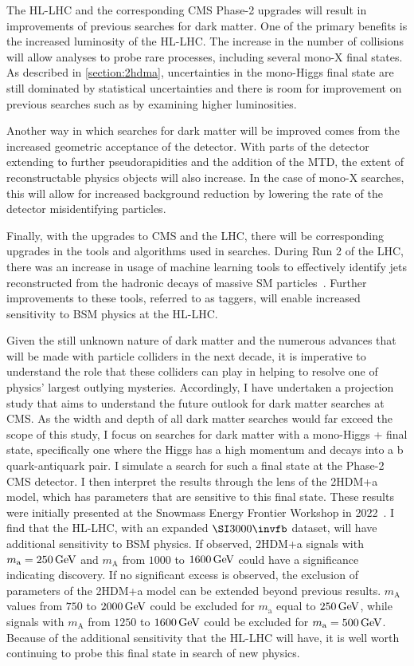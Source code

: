 The HL-LHC and the corresponding CMS Phase-2 upgrades will result in improvements of previous searches for dark matter. One of the primary benefits is the increased luminosity of the HL-LHC. The increase in the number of collisions will allow analyses to probe rare processes, including several mono-X final states. As described in \cref{section:2hdma}, uncertainties in the mono-Higgs final state are still dominated by statistical uncertainties and there is room for improvement on previous searches such as \cite{cms:hbb2019,atlas:hbb2017,atlas:hbb2021} by examining higher luminosities.

Another way in which searches for dark matter will be improved comes from the increased geometric acceptance of the detector. With parts of the detector extending to further pseudorapidities and the addition of the MTD, the extent of reconstructable physics objects will also increase. In the case of mono-X searches, this will allow for increased background reduction by lowering the rate of the detector misidentifying particles.

Finally, with the upgrades to CMS and the LHC, there will be corresponding upgrades in the tools and algorithms used in searches. During Run 2 of the LHC, there was an increase in usage of machine learning tools to effectively identify jets reconstructed from the hadronic decays of massive SM particles~\cite{CMS:2020mlt}. Further improvements to these tools, referred to as taggers, will enable increased sensitivity to BSM physics at the HL-LHC.

Given the still unknown nature of dark matter and the numerous advances that will be made with particle colliders in the next decade, it is imperative to understand the role that these colliders can play in helping to resolve one of physics' largest outlying mysteries. Accordingly, I have undertaken a projection study that aims to understand the future outlook for dark matter searches at CMS. As the width and depth of all dark matter searches would far exceed the scope of this study, I focus on searches for dark matter with a mono-Higgs + \ptmiss final state, specifically one where the Higgs has a high momentum and decays into a b quark-antiquark pair. I simulate a search for such a final state at the Phase-2 CMS detector. I then interpret the results through the lens of the 2HDM+a model, which has parameters that are sensitive to this final state. These results were initially presented at the Snowmass Energy Frontier Workshop in 2022~\cite{CMS-PAS-FTR-22-005}.
I find that the HL-LHC, with an expanded $\fbinv{3000}$ dataset, will have additional sensitivity to BSM physics. If observed, 2HDM+a signals with $m_\mathrm{a} = \GeV{250}$ and $m_\mathrm{A}$ from $1000$ to $\GeV{1600}$ could have a significance indicating discovery.
If no significant excess is observed, the exclusion of parameters of the 2HDM+a model can be extended beyond previous results. $m_\mathrm{A}$ values from $750$ to $\GeV{2000}$ could be excluded for $m_\mathrm{a}$ equal to $\GeV{250}$, while signals with $m_\mathrm{A}$ from $1250$ to $\GeV{1600}$ could be excluded for $m_\mathrm{a} = \GeV{500}$. Because of the additional sensitivity that the HL-LHC will have, it is well worth continuing to probe this final state in search of new physics.
